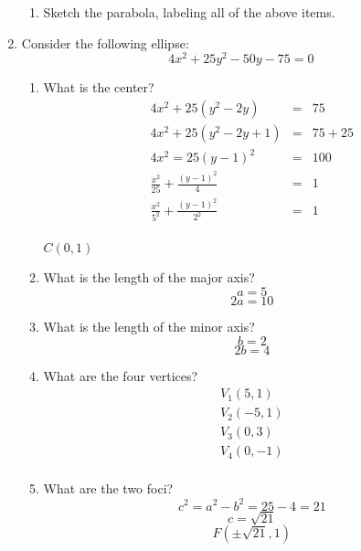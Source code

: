 \documentclass[letterpaper,12pt,fleqn]{article}
\begin{document}
\begin{enumerate}
\begin{enumerate}
  \item Sketch the parabola, labeling all of the above items.
    
  \end{enumerate}

\item Consider the following ellipse:
  \[4x^2+25y^2-50y-75=0\]
  \begin{enumerate}
  \item What is the center?
    \begin{eqnarray*}
      4x^2+25(y^2-2y) &=& 75 \\
      4x^2+25(y^2-2y+1) &=& 75+25 \\
      4x^2=25(y-1)^2 &=& 100 \\
      \frac{x^2}{25}+\frac{(y-1)^2}{4} &=& 1 \\
      \frac{x^2}{5^2}+\frac{(y-1)^2}{2^2} &=& 1 \\
    \end{eqnarray*}

    $C(0,1)$
    
  \item What is the length of the major axis?
    \[a=5\]
    \[2a=10\]
    
  \item What is the length of the minor axis?
    \[b=2\]
    \[2b=4\]
    
  \item What are the four vertices?
    \[\begin{array}{l}
      V_1(5,1) \\
      V_2(-5,1) \\
      V_3(0,3) \\
      V_4(0,-1) \\
    \end{array}\]

  \item What are the two foci?
    \[c^2=a^2-b^2=25-4=21\]
    \[c=\sqrt{21}\]
    \[F(\pm\sqrt{21},1)\]


\end{enumerate}
\end{enumerate}
\end{document}
